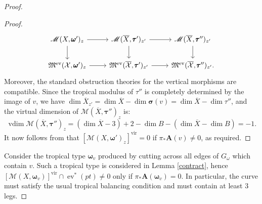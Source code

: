 \documentclass[12pt, oneside]{amsart}   	%
\newcommand{\vir}{\operatorname{vir}}
\newcommand{\vdim}{\operatorname{vdim}}
\newcommand{\ev}{\operatorname{ev}}
\numberwithin{equation}{section}
\numberwithin{thm}{section}
\numberwithin{figure}{section}
\begin{document}
\begin{proof}
\begin{proof}
\begin{equation}\label{vancart}
\begin{tikzcd}
\mathscr{M}(X,\pmb\omega')_z \arrow{r} \arrow{d} &\mathscr{M}(\overline{X},\pmb\tau')_{z'} \arrow{d}\arrow{r} & \mathscr{M}(\overline{X},\pmb\tau'')_{z'} \arrow{d} \\
\mathfrak{M}^{\ev}(\mathcal{X},\pmb\omega')_z\arrow{r} & \mathfrak{M}^{\ev}(\overline{\mathcal{X}},\pmb\tau')_{z'}\arrow{r} & \mathfrak{M}^{\ev}(\overline{\mathcal{X}},\pmb\tau'')_{z'}.
\end{tikzcd}
\end{equation}
Moreover, the standard obstruction theories for the vertical morphisms are compatible. Since the tropical modulus of $\tau''$ is completely determined by the image of $v$, we have $\dim \overline{X}_{z'} = \dim \overline{X} - \dim \pmb\sigma(v) = \dim \overline{X} - \dim \tau''$, and the virtual dimension of $\mathscr{M}(\overline{X},\pmb\tau'')_z$ is:
$$\vdim \mathscr{M}(\overline{X},\pmb\tau'')_z = (\dim \overline{X} - 3) + 2 - \dim B - (\dim \overline{X} - \dim B)  = -1.$$ 
It now follows from \cite[Lemma $A.13$]{int_mirror} that $[\mathscr{M}(X,\pmb\omega')_z]^{\vir} = 0$ if $\pi_*\textbf{A}(v) \not= 0$, as required. 
\end{proof}


Consider the tropical type $\pmb\omega_v$ produced by cutting across all edges of $G_{\omega}$ which contain $v$. Such a tropical type is considered in  Lemma \ref{contract}, hence $[\mathscr{M}(X,\pmb\omega_v)]^{\vir}\cap \ev^*(pt)\not=0$ only if $\pi_*\textbf{A}(\pmb\omega_v) = 0$. In particular, the curve must satisfy the usual tropical balancing condition and must contain at least $3$ legs. 


\end{proof}
\end{document}
